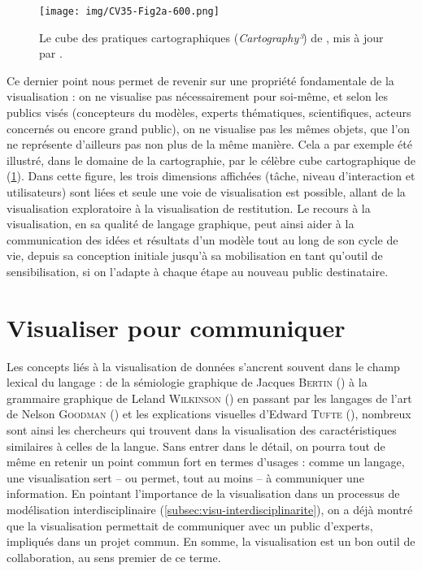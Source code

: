 \documentclass[a4paper, 12pt]{article}
\begin{document}
\begin{figure}[H]
	\centering
	\texttt{[image: img/CV35-Fig2a-600.png]}
	\caption{Le cube des pratiques cartographiques (\og \textit{Cartography³}\fg{}) de \textcite{maceachren2004maps}, \og mis à jour\fg{} par \textcite{coltekin_geovisualization_2018}.}
	\label{fig:cartography3}
\end{figure}

Ce dernier point nous permet de revenir sur une propriété fondamentale de la visualisation : on ne visualise pas nécessairement pour soi-même, et selon les publics visés (concepteurs du modèles, experts thématiques, scientifiques, acteurs concernés ou encore grand public), on ne visualise pas les mêmes objets, que l'on ne représente d'ailleurs pas non plus de la même manière.
Cela a par exemple été illustré, dans le domaine de la cartographie, par le célèbre cube cartographique de  (\cref{fig:cartography3}).
Dans cette figure, les trois dimensions affichées (tâche, niveau d'interaction et utilisateurs) sont liées et seule une \og voie\fg{} de visualisation est possible, allant de la visualisation exploratoire à la visualisation de restitution.
Le recours à la visualisation, en sa qualité de langage graphique, peut ainsi aider à la communication des idées et résultats d'un modèle tout au long de son cycle de vie, depuis sa conception initiale jusqu'à sa mobilisation en tant qu'outil de sensibilisation, si on l'adapte à chaque étape au nouveau public destinataire.

\section{Visualiser pour communiquer}

Les concepts liés à la visualisation de données s'ancrent souvent dans le champ lexical du langage : de la \og sémiologie graphique\fg{} de Jacques \textsc{Bertin} (\citeyear{bertin1973semiologie}) à la \og grammaire graphique\fg{} de Leland \textsc{Wilkinson} (\citeyear{wilkinson_grammar_2006}) en passant par les \og langages de l'art\fg{} de Nelson \textsc{Goodman} (\citeyear{goodman1968languages}) et les \og explications visuelles\fg{} d'Edward \textsc{Tufte} (\citeyear{tufte_visual_1997}), nombreux sont ainsi les chercheurs qui trouvent dans la visualisation des caractéristiques similaires à celles de la langue.
Sans entrer dans le détail, on pourra tout de même en retenir un point commun fort en termes d'usages : comme un langage, une visualisation sert -- ou permet, tout au moins -- à communiquer une information.
En pointant l'importance de la visualisation dans un processus de modélisation interdisciplinaire (\cref{subsec:visu-interdisciplinarite}), on a déjà montré que la visualisation permettait de communiquer avec un public d'experts, impliqués dans un projet commun. En somme, la visualisation est un bon outil de collaboration, au sens premier de ce terme.
\end{document}
